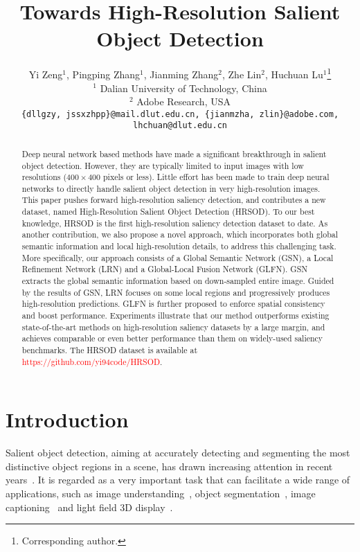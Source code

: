 \documentclass[10pt,twocolumn,letterpaper]{article}
\begin{document}
\title{Towards High-Resolution Salient Object Detection}
\author{Yi Zeng$^1$, Pingping Zhang$^1$, Jianming Zhang$^2$, Zhe Lin$^2$, Huchuan Lu$^1$\thanks{Corresponding author.}\\
$^1$ Dalian University of Technology, China\\
$^2$ Adobe Research, USA\\
{\tt\small \{dllgzy, jssxzhpp\}@mail.dlut.edu.cn, \{jianmzha, zlin\}@adobe.com, lhchuan@dlut.edu.cn}\\
}

\maketitle
\ificcvfinal\thispagestyle{empty}\fi

\begin{abstract}
Deep neural network based methods have made a significant breakthrough in salient object detection.
However, they are typically limited to input images with low resolutions ($400\times400$ pixels or less).
Little effort has been made to train deep neural networks to directly handle salient object detection in very high-resolution images.
This paper pushes forward high-resolution saliency detection, and contributes a new dataset, named High-Resolution Salient Object Detection (HRSOD).
To our best knowledge, HRSOD is the first high-resolution saliency detection dataset to date.
As another contribution, we also propose a novel approach, which incorporates both global semantic information and local high-resolution details, to address this challenging task.
More specifically, our approach consists of a Global Semantic Network (GSN), a Local Refinement Network (LRN) and a Global-Local Fusion Network (GLFN).
GSN extracts the global semantic information based on down-sampled entire image.
Guided by the results of GSN, LRN focuses on some local regions and progressively produces high-resolution predictions.
GLFN is further proposed to enforce spatial consistency and boost performance.
Experiments illustrate that our method outperforms existing state-of-the-art methods on high-resolution saliency datasets by a large margin, and achieves comparable or even better performance than them on widely-used saliency benchmarks.
The HRSOD dataset is available at \textcolor{red}{https://github.com/yi94code/HRSOD}.
\end{abstract}

\section{Introduction}
Salient object detection, aiming at accurately detecting and segmenting the most distinctive object regions in a scene, has drawn increasing attention in recent years~\cite{fan2018salient,zhang2019salient,zhang2018hyperfusion,zhang2018agile,zhang2018non}. It is regarded as a very important task that can facilitate a wide range of applications, such as image understanding~\cite{lai2016saliency,zhu2015unsupervised,zhang2015saliency}, object segmentation~\cite{joon2017exploiting}, image captioning~\cite{fang2015captions,das2017human,xu2015show} and light field 3D display~\cite{wang2018salience}.
\end{document}
